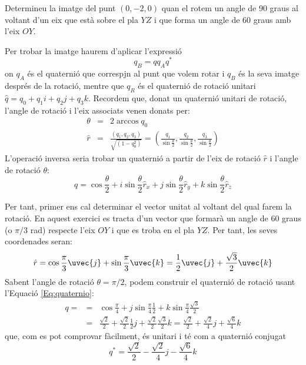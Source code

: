 \Exercise Determineu la imatge del punt $(0,-2,0)$ quan el rotem un angle de 90 graus al voltant d'un eix que està sobre el pla $YZ$ i que forma un angle de 60 graus amb l'eix $OY$.

\Answer 

Per trobar la imatge haurem d'aplicar l'expressió 
\begin{equation}
  q_B= qq_Aq^*  
\label{Eq:rotquaternio}
\end{equation}
on $q_A$ és el quaternió que correspjn al punt que volem rotar i $q_B$ és la seva imatge després de la rotació, mentre que $q_R$ és el quaternió de rotació unitari $\hat{q}=q_0+q_1i+q_2j+q_3k$.
Recordem que, donat un quaternió unitari de rotació, l'angle de rotació i l'eix associats venen donats per:
\begin{eqnarray*}
  \theta &=& 2 \arccos{q_0}\\
  \hat{r}&=& \frac{(q_1,q_2,q_3)}{\sqrt{(1-q_0^2)}} = \left(
  \frac{q_1}{\sin{\frac{\theta}{2}}},
  \frac{q_2}{\sin{\frac{\theta}{2}}},
  \frac{q_3}{\sin{\frac{\theta}{2}}}
  \right)
\end{eqnarray*}
L'operació inversa seria trobar un quaternió a partir de l'eix de rotació $\hat{r}$ i l'angle de rotació $\theta$:
\begin{equation}
  q=\cos{\frac{\theta}{2}}+i\sin{\frac{\theta}{2}}\hat{r}_x+j\sin{\frac{\theta}{2}}\hat{r}_y+k\sin{\frac{\theta}{2}}\hat{r}_z
  \label{Eq:quaternio}
\end{equation}

Per tant, primer ens cal determinar el vector unitat al voltant del qual farem la rotació. En aquest exercici es tracta d'un vector que formarà un angle de 60 graus (o $\pi/3$ rad) respecte l'eix $OY$ i que es troba en el pla $YZ$. Per tant, les seves coordenades seran: 
\[
  \hat{r}=\cos{\frac{\pi}{3}} \uvec{j} + \sin{\frac{\pi}{3}}\uvec{k} = \frac{1}{2}  \uvec{j} + \frac{\sqrt{3}}{2} \uvec{k}
\]
Sabent l'angle de rotació $\theta=\pi/2$, podem construir el quaternió de rotació usant l'Equació \ref{Eq:quaternio}:
\begin{eqnarray*}
  q=&=&
  \cos{\frac{\pi}{4}}+j\sin{\frac{\pi}{4}}\frac{1}{2}+k\sin{\frac{\pi}{4}}\frac{\sqrt{3}}{2}\\
  &=& \frac{\sqrt{2}}{2}+\frac{\sqrt{2}}{2}\frac{1}{2}j+\frac{\sqrt{2}}{2}\frac{\sqrt{3}}{2}k=
  \frac{\sqrt{2}}{2}+\frac{\sqrt{2}}{4}j+\frac{\sqrt{6}}{4}k
\end{eqnarray*}
que, com es pot comprovar fàcilment,  és unitari i  té com a quaternió conjugat
\[
  q^* =\frac{\sqrt{2}}{2}-\frac{\sqrt{2}}{4}j-\frac{\sqrt{6}}{4}k
\]

